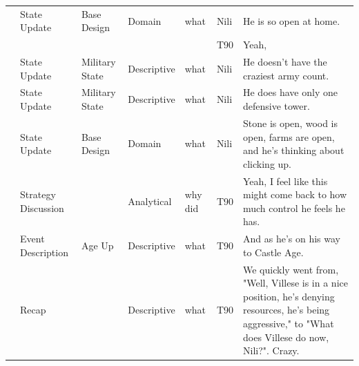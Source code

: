 {\begin{longtable}{@{}>{\theAppRow}r|L{2.3cm}L{2.2cm}L{1.4cm}L{2.2cm}L{0.5cm}U{5.6cm}@{}}
    & State Update          & Base Design                     & Domain      & what              & Nili    & He is so open at home.                                                                                                                                                                                                   \\
    &                       &                      &             &                   & T90     & Yeah,                                                                                                                                                                                                                    \\
    & State Update          & Military State                     & Descriptive   & what              & Nili    & He doesn't have the craziest army count.                                                                                                                                                                                 \\
    & State Update          & Military State       & Descriptive   & what              & Nili    & He does have only one defensive tower.                                                                                                                                                                                   \\
    & State Update          & Base Design         & Domain      & what              & Nili    & Stone is open, wood is open, farms are open, and he's thinking about clicking up.                                                                                                                                        \\
    & Strategy Discussion   &                      & Analytical  & why did           & T90     & Yeah, I feel like this might come back to how much control he feels he has.                                                                                                                                              \\
    & Event Description     & Age Up           & Descriptive   & what              & T90     & And as he's on his way to Castle Age.                                                                                                                                                                                    \\
    & Recap                 &                      & Descriptive   & what              & T90     & We quickly went from, "Well, Villese is in a nice position, he's denying resources, he's being aggressive," to "What does Villese do now, Nili?". Crazy.                                                                 \\

\end{longtable}}
